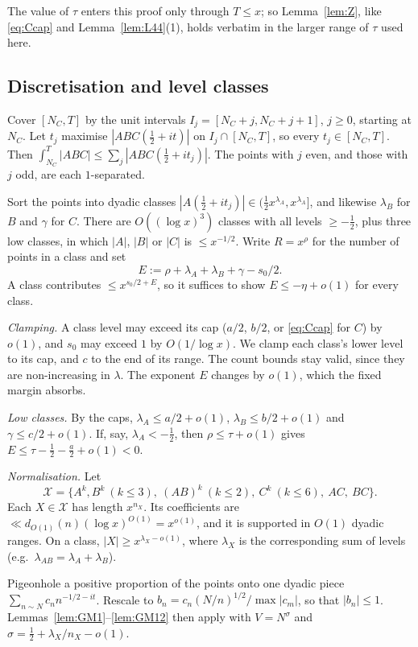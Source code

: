 \documentclass[11pt]{amsart}
\theoremstyle{definition}
\theoremstyle{remark}
\newcommand{\cX}{\mathcal{X}}
\newcommand{\Lfp}{Lemma~\ref{lem:L44}}
\begin{document}
The value of $\tau$ enters this proof only through $T\le x$; so Lemma~\ref{lem:Z}, like \eqref{eq:Ccap} and \Lfp(1), holds verbatim in the
larger range of $\tau$ used here.

\subsection{Discretisation and level classes}\label{sec:levels}

Cover $[N_C,T]$ by the unit intervals $I_j=[N_C+j,N_C+j+1]$, $j\ge0$, starting at $N_C$. Let $t_j$ maximise $|ABC(\frac12+it)|$ on
$I_j\cap[N_C,T]$, so every $t_j\in[N_C,T]$. Then $\int_{N_C}^T|ABC|\le\sum_j|ABC(\frac12+it_j)|$. The points with $j$ even, and those with
$j$ odd, are each $1$-separated.

Sort the points into dyadic classes $|A(\frac12+it_j)|\in(\frac12x^{\lambda_A},x^{\lambda_A}]$, and likewise $\lambda_B$ for $B$ and
$\gamma$ for $C$. There are $O((\log x)^3)$ classes with all levels $\ge-\frac12$, plus three low classes, in which $|A|$, $|B|$ or $|C|$ is $\le x^{-1/2}$.
Write $R=x^{\rho}$ for the number of points in a class and set
\[
E:=\rho+\lambda_A+\lambda_B+\gamma-s_0/2.
\]
A class contributes $\le x^{s_0/2+E}$, so it suffices to show $E\le-\eta+o(1)$ for every class.

\emph{Clamping.} A class level may exceed its cap ($a/2$, $b/2$, or \eqref{eq:Ccap} for $C$) by $o(1)$, and $s_0$ may exceed $1$ by
$O(1/\log x)$. We clamp each class's lower level to its cap, and $c$ to the end of its range. The count bounds stay valid, since they are
non-increasing in $\lambda$. The exponent $E$ changes by $o(1)$, which the fixed margin absorbs.

\emph{Low classes.} By the caps, $\lambda_A\le a/2+o(1)$, $\lambda_B\le b/2+o(1)$ and $\gamma\le c/2+o(1)$. If, say, $\lambda_A<-\frac12$, then
$\rho\le\tau+o(1)$ gives $E\le\tau-\frac12-\frac a2+o(1)<0$.

\emph{Normalisation.} Let
\[
\cX=\{A^k,B^k\ (k\le3),\ (AB)^k\ (k\le2),\ C^k\ (k\le6),\ AC,\ BC\}.
\]
Each $X\in\cX$ has length $x^{n_X}$. Its coefficients are $\ll d_{O(1)}(n)(\log x)^{O(1)}=x^{o(1)}$, and it is supported in $O(1)$ dyadic ranges.
On a class, $|X|\ge x^{\lambda_X-o(1)}$, where $\lambda_X$ is the corresponding sum of levels (e.g.\ $\lambda_{AB}=\lambda_A+\lambda_B$).

Pigeonhole a positive proportion of the points onto one dyadic piece $\sum_{n\sim N}c_nn^{-1/2-it}$. Rescale to
$b_n=c_n(N/n)^{1/2}/\max|c_m|$, so that $|b_n|\le1$. Lemmas~\ref{lem:GM1}--\ref{lem:GM12} then apply with $V=N^{\sigma}$ and
$\sigma=\frac12+\lambda_X/n_X-o(1)$.
\end{document}
